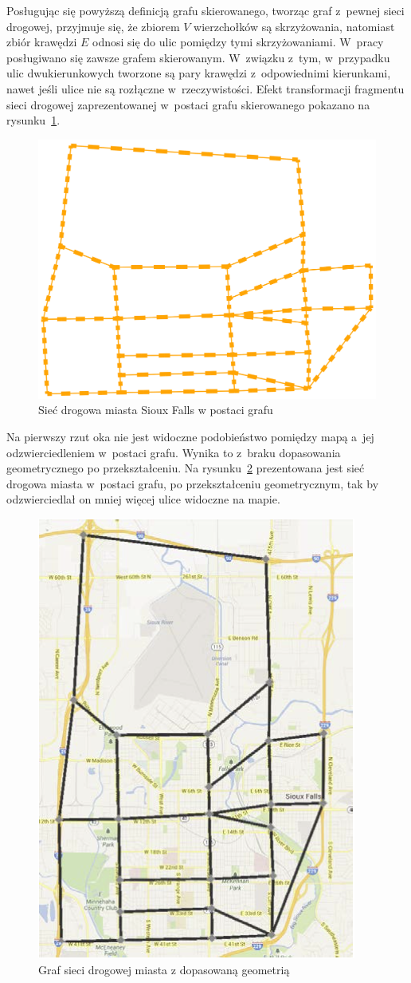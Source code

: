 \documentclass[twoside,12pt]{report}
\begin{document}
Posługując się powyższą definicją grafu skierowanego, tworząc graf z~pewnej sieci drogowej, przyjmuje się, że zbiorem $V$ wierzchołków są skrzyżowania, natomiast zbiór krawędzi $E$ odnosi się do ulic pomiędzy tymi skrzyżowaniami. W~pracy posługiwano się zawsze grafem skierowanym. W~związku z~tym, w~przypadku ulic dwukierunkowych tworzone są pary krawędzi z~odpowiednimi kierunkami, nawet jeśli ulice nie są rozłączne w~rzeczywistości. Efekt transformacji fragmentu sieci drogowej zaprezentowanej w~postaci grafu skierowanego pokazano na rysunku~\ref{fig:siouxfalls_ex_graf}.

\begin{figure}[htbp]
	\centering
	\includegraphics[width=0.5\linewidth]{img/graf}
	\caption{Sieć drogowa miasta Sioux Falls w postaci grafu}
	\label{fig:siouxfalls_ex_graf}
\end{figure}

Na pierwszy rzut oka nie jest widoczne podobieństwo pomiędzy mapą a~jej odzwierciedleniem w~postaci grafu. Wynika to z~braku dopasowania geometrycznego po przekształceniu. Na rysunku~\ref{fig:siouxfalls_ex_graf_geometry} prezentowana jest sieć drogowa miasta w~postaci grafu, po przekształceniu geometrycznym, tak by odzwierciedlał on mniej więcej ulice widoczne na mapie.

\begin{figure}[htbp]
	\centering
	\includegraphics[width=0.42\linewidth]{img/dopasowanie}
	\caption{Graf sieci drogowej miasta z dopasowaną geometrią}
	\label{fig:siouxfalls_ex_graf_geometry}
\end{figure}
\end{document}
